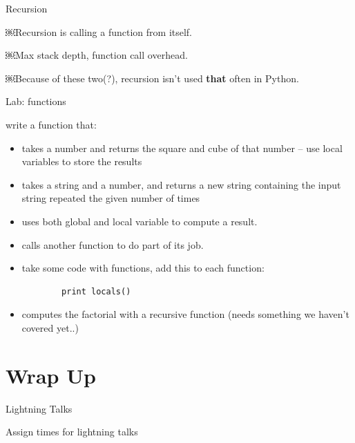 \documentclass{beamer}
\begin{document}
\begin{frame}[fragile]{Recursion}

\vspace{0.5in}
{\Large￼Recursion is calling a function from itself.}

\vspace{0.5in}
{\Large￼Max stack depth, function call overhead.}

\vspace{0.5in}
{\Large￼Because of these two(?), recursion isn't used {\bf that} often in Python.}

\end{frame}

\begin{frame}[fragile]{Lab: functions}

{\Large write a function that:}
\begin{itemize}
  \item takes a number and returns the square and cube of that number
   -- use local variables to store the results
  \item takes a string and a number, and returns a new string containing the input string repeated the given number of times
  \item uses both global and local variable to compute a result.
  \item calls another function to do part of its job.
  \item take some code with functions, add this to each function:
    \begin{verbatim}
        print locals()
    \end{verbatim}
  \item computes the factorial with a recursive function (needs something we haven't covered yet..)
\end{itemize}

\end{frame}


\section{Wrap Up}

\begin{frame}{Lightning Talks}

\vspace{0.5in}
{\Large Assign times for lightning talks}

\vspace{0.5in}

\end{frame}
\end{document}
